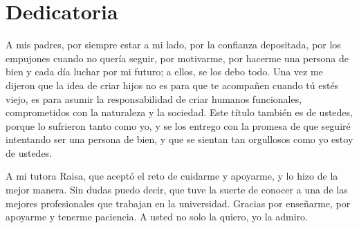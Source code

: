 \chapter*{Dedicatoria}
A mis padres, por siempre estar a mi lado, por la confianza depositada, por los empujones cuando no quería seguir, por motivarme, por hacerme una persona de bien y cada día luchar por mi futuro; a ellos, se los debo todo. Una vez me dijeron que la idea de criar hijos no es para que te acompañen cuando tú estés viejo, es para asumir la responsabilidad de criar humanos funcionales, comprometidos con la naturaleza y la sociedad. Este título también es de ustedes, porque lo sufrieron tanto como yo, y se los entrego con la promesa de que seguiré intentando ser una persona de bien, y que se sientan tan orgullosos como yo estoy de ustedes.

A mi tutora Raisa, que aceptó el reto de cuidarme y apoyarme, y lo hizo de la mejor manera. Sin dudas puedo decir, que tuve la suerte de conocer a una de las mejores profesionales que trabajan en la universidad. Gracias por enseñarme, por apoyarme y tenerme paciencia. A usted no solo la quiero, yo la admiro.